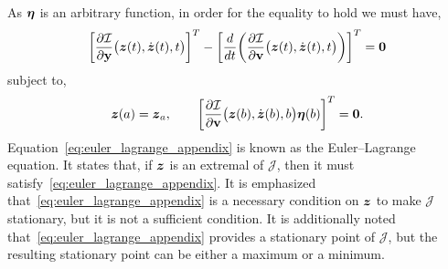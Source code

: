 \documentclass[3p,computermodern,10pt]{elsarticle}
\begin{document}
\begin{appendices}
$$$$
As $\boldsymbol \eta$ is an arbitrary function, in order for the equality to hold we must have,
\begin{equation}\label{eq:euler_lagrange_appendix}
\bigg[ \frac{\partial \mathcal{I}  }{\partial \mathbf{y} } \big(\boldsymbol z(t),\dot{\boldsymbol z}(t) ,t\big) \bigg]^T - \bigg[ \frac{d}{dt}\bigg( \frac{\partial \mathcal{I}}{\partial \mathbf{{v}} }  \big(\boldsymbol z(t),\dot{\boldsymbol z}(t),t \big) \bigg) \bigg]^T = \boldsymbol 0  
\end{equation}
subject to,
$$
\boldsymbol z(a) = \boldsymbol z_a, \qquad \bigg[ \frac{\partial \mathcal{I}}{\partial \mathbf{{v}}} \big(\boldsymbol z(b),\dot{\boldsymbol z}(b),b \big) \boldsymbol \eta(b) \bigg]^T = \boldsymbol 0.
$$
Equation~\eqref{eq:euler_lagrange_appendix} is known as the Euler--Lagrange equation. It states that, if $\boldsymbol z$ is an extremal of $\mathcal{J}$, then it must satisfy~\eqref{eq:euler_lagrange_appendix}. It is emphasized that~\eqref{eq:euler_lagrange_appendix} is a necessary condition on $\boldsymbol z$ to make $\mathcal{J}$ stationary, but it is not a sufficient condition. It is additionally noted that~\eqref{eq:euler_lagrange_appendix} provides a stationary point of $\mathcal{J}$, but the resulting stationary point can be either a maximum or a minimum.


\end{appendices}
\end{document}

